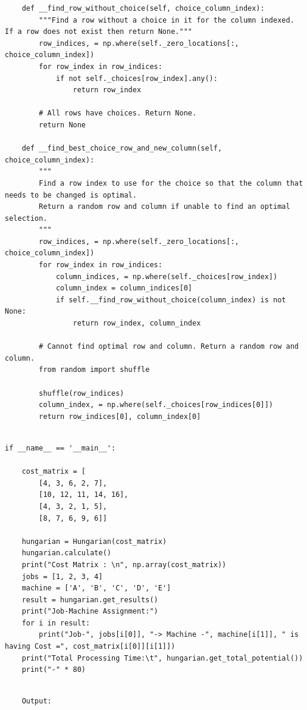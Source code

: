 \documentclass[12pt, letterpaper, twoside]{book}
\begin{document}
\begin{lstlisting}
    def __find_row_without_choice(self, choice_column_index):
        """Find a row without a choice in it for the column indexed. If a row does not exist then return None."""
        row_indices, = np.where(self._zero_locations[:, choice_column_index])
        for row_index in row_indices:
            if not self._choices[row_index].any():
                return row_index

        # All rows have choices. Return None.
        return None

    def __find_best_choice_row_and_new_column(self, choice_column_index):
        """
        Find a row index to use for the choice so that the column that needs to be changed is optimal.
        Return a random row and column if unable to find an optimal selection.
        """
        row_indices, = np.where(self._zero_locations[:, choice_column_index])
        for row_index in row_indices:
            column_indices, = np.where(self._choices[row_index])
            column_index = column_indices[0]
            if self.__find_row_without_choice(column_index) is not None:
                return row_index, column_index

        # Cannot find optimal row and column. Return a random row and column.
        from random import shuffle

        shuffle(row_indices)
        column_index, = np.where(self._choices[row_indices[0]])
        return row_indices[0], column_index[0]

\end{lstlisting}
\pagebreak
\begin{lstlisting}

if __name__ == '__main__':

    cost_matrix = [
        [4, 3, 6, 2, 7],
        [10, 12, 11, 14, 16],
        [4, 3, 2, 1, 5],
        [8, 7, 6, 9, 6]]

    hungarian = Hungarian(cost_matrix)
    hungarian.calculate()
    print("Cost Matrix : \n", np.array(cost_matrix))
    jobs = [1, 2, 3, 4]
    machine = ['A', 'B', 'C', 'D', 'E']
    result = hungarian.get_results()
    print("Job-Machine Assignment:")
    for i in result:
        print("Job-", jobs[i[0]], "-> Machine -", machine[i[1]], " is having Cost =", cost_matrix[i[0]][i[1]])
    print("Total Processing Time:\t", hungarian.get_total_potential())
    print("-" * 80)

\end{lstlisting}
\pagebreak
\begin{lstlisting}

	Output:

\end{lstlisting}
\end{document}
